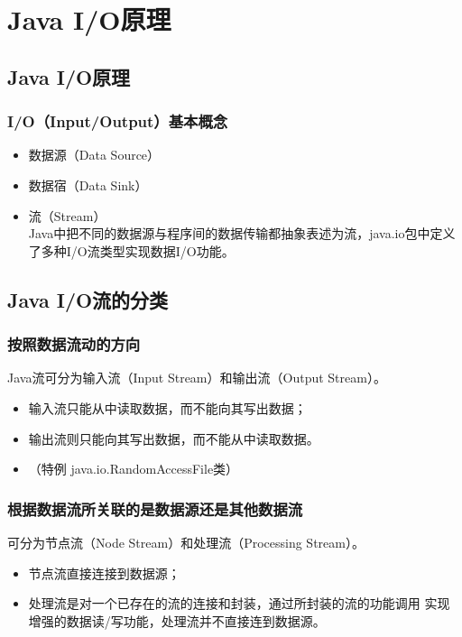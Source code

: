 \section{Java I/O原理}

\subsection{Java I/O原理}

\subsubsection{ I/O（Input/Output）基本概念}

\begin{itemize}
\item 数据源（Data Source）
\item 数据宿（Data Sink）
\item 流（Stream）\\
  {\kai Java中把不同的数据源与程序间的数据传输都抽象表述为流，java.io包中定义
    了多种I/O流类型实现数据I/O功能。}
\end{itemize}

\subsection{Java I/O流的分类}

\subsubsection{按照数据流动的方向}

{\hei Java流可分为输入流（Input Stream）和输出流（Output Stream）。}

\begin{itemize}
\item 输入流只能从中读取数据，而不能向其写出数据；
\item 输出流则只能向其写出数据，而不能从中读取数据。
\item {\Mage （特例 java.io.RandomAccessFile类）}
\end{itemize}


\subsubsection{根据数据流所关联的是数据源还是其他数据流}  

{\hei 可分为节点流（Node Stream）和处理流（Processing Stream）。}

\begin{itemize}
\item 节点流直接连接到数据源；
\item 处理流是对一个已存在的流的连接和封装，通过所封装的流的功能调用
  实现增强的数据读/写功能，处理流并不直接连到数据源。
\end{itemize}


